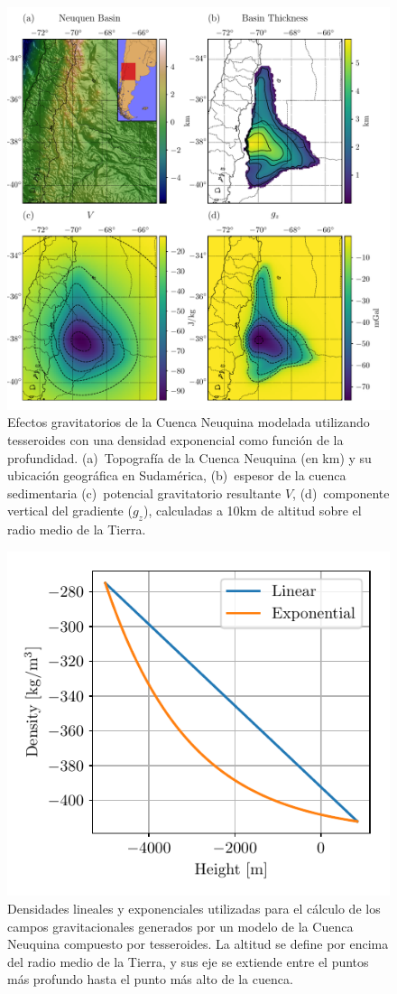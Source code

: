 \begin{figure}
\centering
\includegraphics[width=\linewidth]{
    figs/tesseroids-variable-density/neuquen-basin.pdf
}
\caption{
    Efectos gravitatorios de la Cuenca Neuquina modelada utilizando tesseroides
    con una densidad exponencial como función de la profundidad.
    (a)~Topografía de la Cuenca Neuquina (en km) y su ubicación geográfica en
    Sudamérica,
    (b)~espesor de la cuenca sedimentaria \citep[in meters;][]{heine2007}
    (c)~potencial gravitatorio resultante $V$,
    (d)~componente vertical del gradiente ($g_z$),
    calculadas a 10km de altitud sobre el radio medio de la Tierra.
}
\label{fig:neuquen-basin}
\end{figure}

\begin{figure}
\centering
\includegraphics[width=0.5\linewidth]{
    figs/tesseroids-variable-density/neuquen-basin-densities.pdf
}
\caption{
    Densidades lineales y exponenciales utilizadas para el cálculo de los
    campos gravitacionales generados por un modelo de la Cuenca Neuquina
    compuesto por tesseroides.
    La altitud se define por encima del radio medio de la Tierra, y sus eje se
    extiende entre el puntos más profundo hasta el punto más alto de la cuenca.
}
\label{fig:neuquen-basin-densities}
\end{figure}


